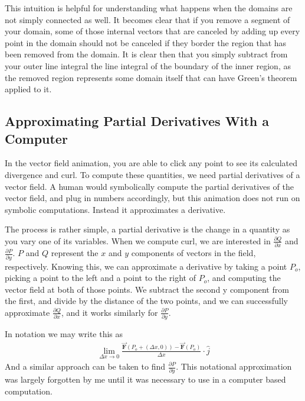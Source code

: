 \documentclass{article}
\begin{document}
    This intuition is helpful for understanding what happens when the domains are not simply connected as well.
    It becomes clear that if you remove a segment of your domain, some of those internal vectors that are canceled by adding up every point in the domain should not be canceled if they border the region that has been removed from the domain.
    It is clear then that you simply subtract from your outer line integral the line integral of the boundary of the inner region, as the removed region represents some domain itself that can have Green's theorem applied to it.

    \subsection*{Approximating Partial Derivatives With a Computer}
    In the vector field animation, you are able to click any point to see its calculated divergence and curl.
    To compute these quantities, we need partial derivatives of a vector field.
    A human would symbolically compute the partial derivatives of the vector field, and plug in numbers accordingly, but this animation does not run on symbolic computations.
    Instead it approximates a derivative.

    The process is rather simple, a partial derivative is the change in a quantity as you vary one of its variables.
    When we compute curl, we are interested in $\frac{\partial Q}{\partial x}$ and $\frac{\partial P}{\partial y}$.
    $P$ and $Q$ represent the $x$ and $y$ components of vectors in the field, respectively.
    Knowing this, we can approximate a derivative by taking a point $P_o$, picking a point to the left and a point to the right of $P_o$, and computing the vector field at both of those points.
    We subtract the second y component from the first, and divide by the distance of the two points, and we can successfully approximate $\frac{\partial Q}{\partial x}$, and it works similarly for $\frac{\partial P}{\partial y}$.

    In notation we may write this as
    \begin{gather*}
    \lim_{\Delta x \to 0} \frac{\vec{\mathbf{F}}(P_o + (\Delta x, 0)) - \vec{\mathbf{F}} (P_o)}{\Delta x} \cdot \hat{j}
    \end{gather*}
    And a similar approach can be taken to find $\frac{\partial P}{\partial y}$.
    This notational approximation was largely forgotten by me until it was necessary to use in a computer based computation.
\end{document}
